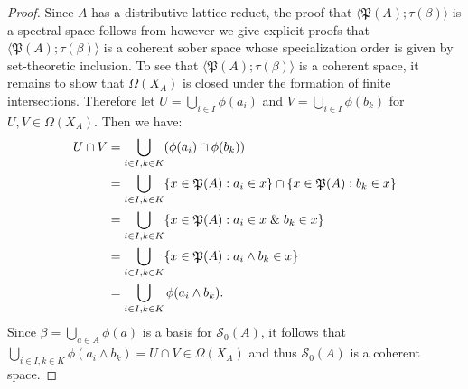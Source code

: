 \documentclass{amsart}
\theoremstyle{plain}
\theoremstyle{definition}
\begin{document}
\begin{proof}
Since $A$ has a distributive lattice reduct, the  proof that $\langle\mathfrak{P}(A);\tau(\beta)\rangle$ is a spectral space follows from \cite{stone2} however we give explicit proofs that $\langle\mathfrak{P}(A);\tau(\beta)\rangle$ is a coherent sober space whose specialization order is given by set-theoretic inclusion. To see that $\langle\mathfrak{P}(A);\tau(\beta)\rangle$ is a coherent space, it remains to show that $\Omega(X_A)$ is closed under the formation of finite intersections. Therefore let $U=\bigcup_{i\in I}\phi(a_i)$ and $V=\bigcup_{i\in I}\phi(b_k)$ for $U,V\in \Omega(X_A)$. Then we have: 
  \begin{align*}
      U\cap V&=\bigcup_{i\in I,k\in K}(\phi(a_i)\cap\phi(b_k))
      \\&=\bigcup_{i\in I,k\in K}\{x\in\mathfrak{P}(A):a_i\in x\}\cap\{x\in\mathfrak{P}(A):b_k\in x\}
      \\&=\bigcup_{i\in I,k\in K}\{x\in\mathfrak{P}(A):a_i\in x\hspace{.1cm}\&\hspace{.1cm} b_k\in x\}
      \\&=\bigcup_{i\in I,k\in K}\{x\in\mathfrak{P}(A):a_i\wedge b_k\in x\}
      \\&=\bigcup_{i\in I,k\in K}\phi(a_i\wedge b_k).
  \end{align*}
Since $\beta=\bigcup_{a\in A}\phi(a)$ is a basis for $\mathcal{S}_0(A)$, it follows that  $\bigcup_{i\in I,k\in K}\phi(a_i\wedge b_k)=U\cap V\in\Omega(X_A)$ and thus $\mathcal{S}_0(A)$ is a coherent space.
    

\end{proof}
\end{document}
